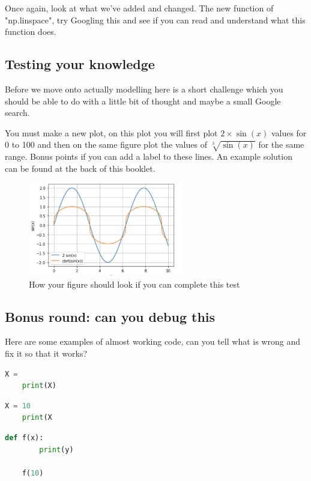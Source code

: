 \documentclass[12pt]{article}
\begin{document}
Once again, look at what we've added and changed. The new function of "np.linspace", try Googling this and see if you can read and understand what this function does. 


\subsection{Testing your knowledge}

Before we move onto actually modelling here is a short challenge which you should be able to do with a little bit of thought and maybe a small Google search. 

You must make a new plot, on this plot you will first plot $2 \times \sin(x)$ values for 0 to 100 and then on the same figure plot the values of $\sqrt[3]{\sin(x)}$ for the same range. Bonus points if you can add a label to these lines. An example solution can be found at the back of this booklet. 

\begin{figure}[!h]
    \centering
    \includegraphics[width=0.6\textwidth]{figures/ssIM3.png}
    \caption{How your figure should look if you can complete this test}
\end{figure}

\subsection{Bonus round: can you debug this}

Here are some examples of almost working code, can you tell what is wrong and fix it so that it works? 


\begin{lstlisting}[language=Python]
    X = 
    print(X)
\end{lstlisting}


\begin{lstlisting}[language=Python]
    X = 10
    print(X
\end{lstlisting}


\begin{lstlisting}[language=Python]
    def f(x):
        print(y)

    f(10)
\end{lstlisting}
\end{document}
